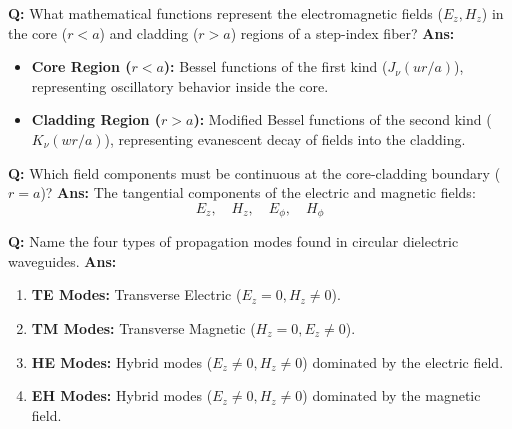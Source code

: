 \documentclass[10pt,a4paper,twocolumn]{article}
\begin{document}
\begin{tcolorbox}[
  colback=white,
  colframe=UnitColorTwo,
  colbacktitle=gray!10!white,
  coltitle=black,
  fonttitle=\bfseries\sffamily\small,
  title={Unit II $\bullet$ Card 8: Field Distribution Functions (Core vs. Cladding)},
  boxrule=1.2pt,
  arc=2mm,
  outer arc=2mm,
  boxsep=1.5mm,
  top=1mm,
  bottom=1mm,
  left=1.5mm,
  right=1.5mm,
  before skip=2.5mm,
  after skip=2.5mm
]
\textbf{Q:} What mathematical functions represent the electromagnetic fields ($E_z, H_z$) in the core ($r < a$) and cladding ($r > a$) regions of a step-index fiber?
\tcbline
\textbf{Ans:} \begin{itemize}
  \item   \textbf{Core Region ($r < a$):} Bessel functions of the first kind ($J_\nu(u r / a)$), representing oscillatory behavior inside the core.
  \item   \textbf{Cladding Region ($r > a$):} Modified Bessel functions of the second kind ($K_\nu(w r / a)$), representing evanescent decay of fields into the cladding.
\end{itemize}
\end{tcolorbox}


\begin{tcolorbox}[
  colback=white,
  colframe=UnitColorTwo,
  colbacktitle=gray!10!white,
  coltitle=black,
  fonttitle=\bfseries\sffamily\small,
  title={Unit II $\bullet$ Card 9: Waveguide Boundary Continuity},
  boxrule=1.2pt,
  arc=2mm,
  outer arc=2mm,
  boxsep=1.5mm,
  top=1mm,
  bottom=1mm,
  left=1.5mm,
  right=1.5mm,
  before skip=2.5mm,
  after skip=2.5mm
]
\textbf{Q:} Which field components must be continuous at the core-cladding boundary ($r = a$)?
\tcbline
\textbf{Ans:} The tangential components of the electric and magnetic fields:
    \[ E_z, \quad H_z, \quad E_\phi, \quad H_\phi \]
\end{tcolorbox}


\begin{tcolorbox}[
  colback=white,
  colframe=UnitColorTwo,
  colbacktitle=gray!10!white,
  coltitle=black,
  fonttitle=\bfseries\sffamily\small,
  title={Unit II $\bullet$ Card 10: Propagation Mode Classes},
  boxrule=1.2pt,
  arc=2mm,
  outer arc=2mm,
  boxsep=1.5mm,
  top=1mm,
  bottom=1mm,
  left=1.5mm,
  right=1.5mm,
  before skip=2.5mm,
  after skip=2.5mm
]
\textbf{Q:} Name the four types of propagation modes found in circular dielectric waveguides.
\tcbline
\textbf{Ans:} \begin{enumerate}
  \item \textbf{TE Modes:} Transverse Electric ($E_z = 0, H_z \neq 0$).
  \item \textbf{TM Modes:} Transverse Magnetic ($H_z = 0, E_z \neq 0$).
  \item \textbf{HE Modes:} Hybrid modes ($E_z \neq 0, H_z \neq 0$) dominated by the electric field.
  \item \textbf{EH Modes:} Hybrid modes ($E_z \neq 0, H_z \neq 0$) dominated by the magnetic field.
\end{enumerate}
\end{tcolorbox}
\end{document}
